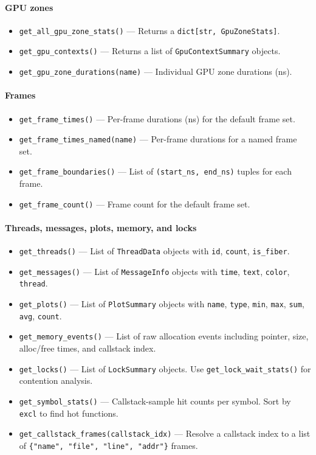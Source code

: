 \documentclass[hidelinks,titlepage,a4paper,twoside]{article}
\begin{document}
\paragraph{GPU zones}
\begin{itemize}
\item \texttt{get\_all\_gpu\_zone\_stats()} --- Returns a \texttt{dict[str, GpuZoneStats]}.
\item \texttt{get\_gpu\_contexts()} --- Returns a list of \texttt{GpuContextSummary} objects.
\item \texttt{get\_gpu\_zone\_durations(name)} --- Individual GPU zone durations (ns).
\end{itemize}

\paragraph{Frames}
\begin{itemize}
\item \texttt{get\_frame\_times()} --- Per-frame durations (ns) for the default frame set.
\item \texttt{get\_frame\_times\_named(name)} --- Per-frame durations for a named frame set.
\item \texttt{get\_frame\_boundaries()} --- List of \texttt{(start\_ns, end\_ns)} tuples for each frame.
\item \texttt{get\_frame\_count()} --- Frame count for the default frame set.
\end{itemize}

\paragraph{Threads, messages, plots, memory, and locks}
\begin{itemize}
\item \texttt{get\_threads()} --- List of \texttt{ThreadData} objects with \texttt{id}, \texttt{count}, \texttt{is\_fiber}.
\item \texttt{get\_messages()} --- List of \texttt{MessageInfo} objects with \texttt{time}, \texttt{text}, \texttt{color}, \texttt{thread}.
\item \texttt{get\_plots()} --- List of \texttt{PlotSummary} objects with \texttt{name}, \texttt{type}, \texttt{min}, \texttt{max}, \texttt{sum}, \texttt{avg}, \texttt{count}.
\item \texttt{get\_memory\_events()} --- List of raw allocation events including pointer, size, alloc/free times, and callstack index.
\item \texttt{get\_locks()} --- List of \texttt{LockSummary} objects. Use \texttt{get\_lock\_wait\_stats()} for contention analysis.
\item \texttt{get\_symbol\_stats()} --- Callstack-sample hit counts per symbol. Sort by \texttt{excl} to find hot functions.
\item \texttt{get\_callstack\_frames(callstack\_idx)} --- Resolve a callstack index to a list of \texttt{\{"name", "file", "line", "addr"\}} frames.
\end{itemize}
\end{document}
